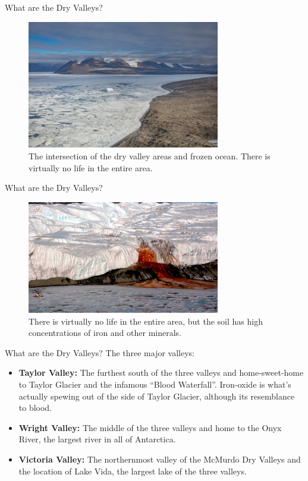 \documentclass{beamer}
\begin{document}
\begin{frame}{What are the Dry Valleys?}
\begin{figure}
\centering
\includegraphics[width=0.75\textwidth]{dry4.jpg}
\caption{\label{fig:map4} The intersection of the dry valley areas and frozen ocean.  There is virtually no life in the entire area.}
\end{figure}
\end{frame}

\begin{frame}{What are the Dry Valleys?}
\begin{figure}
\centering
\includegraphics[width=0.75\textwidth]{blood.jpg}
\caption{\label{fig:blood} There is virtually no life in the entire area, but the soil has high concentrations of iron and other minerals.}
\end{figure}
\end{frame}

\begin{frame}{What are the Dry Valleys?}
\small
The three major valleys:
\begin{itemize}
\item \textbf{Taylor Valley:} The furthest south of the three valleys and home-sweet-home to Taylor Glacier and the infamous “Blood Waterfall”. Iron-oxide is what’s actually spewing out of the side of Taylor Glacier, although its resemblance to blood.
\item \textbf{Wright Valley:} The middle of the three valleys and home to the Onyx River, the largest river in all of Antarctica.
\item \textbf{Victoria Valley:} The northernmost valley of the McMurdo Dry Valleys and the location of Lake Vida, the largest lake of the three valleys.
\end{itemize}
\end{frame}
\end{document}
